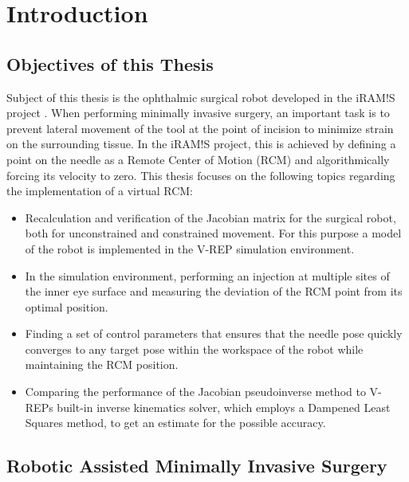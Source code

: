 
\chapter{Introduction}

\section{Objectives of this Thesis}
Subject of this thesis is the ophthalmic surgical robot developed in the iRAM!S project \cite{iramis}. When performing minimally invasive surgery, an important task is to prevent lateral movement of the tool at the point of incision to minimize strain on the surrounding tissue. In the iRAM!S project, this is achieved by defining a point on the needle as a Remote Center of Motion (RCM) and algorithmically forcing its velocity to zero. This thesis focuses on the following topics regarding the implementation of a virtual RCM:
\begin{itemize}
	\item Recalculation and verification of the Jacobian matrix for the surgical robot, both for unconstrained and constrained movement. For this purpose a model of the robot is implemented in the V-REP simulation environment.
	\item In the simulation environment, performing an injection at multiple sites of the inner eye surface and measuring the deviation of the RCM point  from its optimal position.
	\item Finding a set of control parameters that ensures that the needle pose quickly converges to any target pose within the workspace of the robot while maintaining the RCM position. 
	\item Comparing the performance of the Jacobian pseudoinverse method to V-REPs built-in inverse kinematics solver, which employs a Dampened Least Squares method, to get an estimate for the possible accuracy.
\end{itemize} 

\section{Robotic Assisted Minimally Invasive Surgery}

